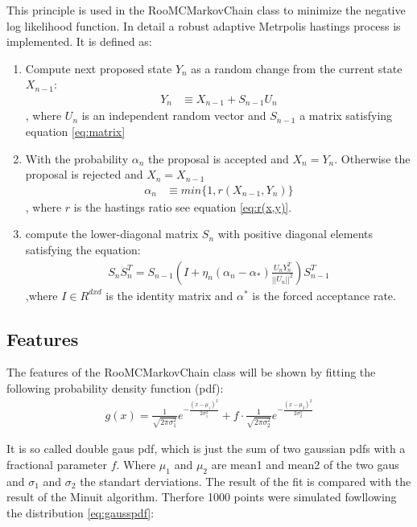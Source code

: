\documentclass[english]{uzhpub}
\begin{document}
This principle is used in the RooMCMarkovChain class to minimize the negative log likelihood function. In detail a robust adaptive Metrpolis hastings process is implemented. It is defined as:
\begin{enumerate}
  \item  Compute next proposed state $Y_n$ as a random change from the current state $X_{n-1}$:
  \begin{align*}   Y_n &\equiv X_{n-1} + S_{n-1} U_n    \end{align*}
  , where $U_n$ is an independent random vector and $S_{n-1}$ a matrix satisfying equation \ref{eq:matrix}
  \item With the probability $\alpha_n$ the proposal is accepted and $X_n = Y_n$. Otherwise the proposal is rejected and $X_n = X_{n-1}$
  \begin{align*}  \alpha_n &\equiv min\{ 1, r(X_{n-1},Y_n) \} \end{align*}
  , where $r$ is the hastings ratio see equation \ref{eq:r(x,y)}.
  \item compute the lower-diagonal matrix $S_n$ with positive diagonal elements satisfying the equation:
  \begin{align}
    S_n S_n^T = S_{n-1} \left( I + \eta_n(\alpha_n - \alpha_*) \frac{U_n Y_n^T}{||U_n||^2} \right) S_{n-1}^T \label{eq:matrix}
  \end{align}
  ,where $I \in R^{dxd}$ is the identity matrix and $\alpha^*$ is the forced acceptance rate.
\end{enumerate}



\subsection{Features} \label{sec:features}
 The features of the RooMCMarkovChain class will be shown by fitting the following probability density function (pdf):
\begin{align}
  g(x) = \frac{1}{\sqrt{2 \pi \sigma_1^2}} e^{- \frac{(x-\mu_1)^2}{2 \sigma_1^2}} + f \cdot  \frac{1}{\sqrt{2 \pi \sigma_2^2}} e^{- \frac{(x-\mu_2)^2}{2 \sigma_2^2}} \label{eq:gausspdf}
 \end{align}


It is so called double gaus pdf, which is just the sum of two gaussian pdfs with a fractional parameter $f$. Where $\mu_1$ and $\mu_2$ are mean1 and mean2 of the two gaus and $\sigma_1$ and $\sigma_2$ the standart derviations.
The result of the fit is compared with the result of the Minuit algorithm. Therfore 1000 points were simulated fowllowing the distribution \ref{eq:gausspdf}:
\end{document}
